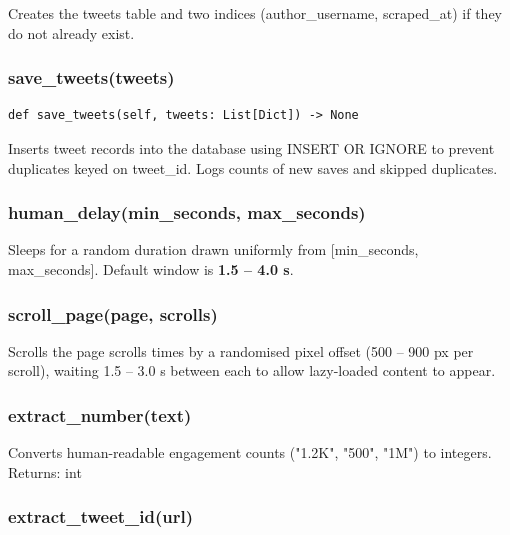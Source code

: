 \documentclass[11pt, a4paper]{article}
\def\method#1{#1}%
\def\param#1{#1}%
\def\returns#1{Returns: #1}%
\def\texttt#1{#1}%
\def\color#1{}%
\newcommand{\method}[1]{\texttt{\color{TwBlue}#1}}
\newcommand{\param}[1]{\texttt{\color{TwGreen!70!black}#1}}
\newcommand{\returns}[1]{\textbf{Returns:} \texttt{#1}}
\begin{document}
Creates the \texttt{tweets} table and two indices (\texttt{author\_username},
\texttt{scraped\_at}) if they do not already exist.

\subsubsection{\texorpdfstring{\method{save\_tweets(tweets)}}{}}

\begin{tcolorbox}[pybox, title={\texttt{save\_tweets}}]
\begin{lstlisting}[style=pycode]
def save_tweets(self, tweets: List[Dict]) -> None
\end{lstlisting}
\end{tcolorbox}

Inserts tweet records into the database using \texttt{INSERT OR IGNORE} to
prevent duplicates keyed on \texttt{tweet\_id}. Logs counts of new saves and
skipped duplicates.

\subsubsection{\texorpdfstring{\method{human\_delay(min\_seconds, max\_seconds)}}{}}

Sleeps for a random duration drawn uniformly from
\texttt{[min\_seconds, max\_seconds]}. Default window is \textbf{1.5 -- 4.0 s}.

\subsubsection{\texorpdfstring{\method{scroll\_page(page, scrolls)}}{}}

Scrolls the page \param{scrolls} times by a randomised pixel offset
(500 -- 900 px per scroll), waiting 1.5 -- 3.0 s between each to allow
lazy-loaded content to appear.

\subsubsection{\texorpdfstring{\method{extract\_number(text)}}{}}

Converts human-readable engagement counts (\texttt{"1.2K"}, \texttt{"500"},
\texttt{"1M"}) to integers. \returns{int}

\subsubsection{\texorpdfstring{\method{extract\_tweet\_id(url)}}{}}
\end{document}
